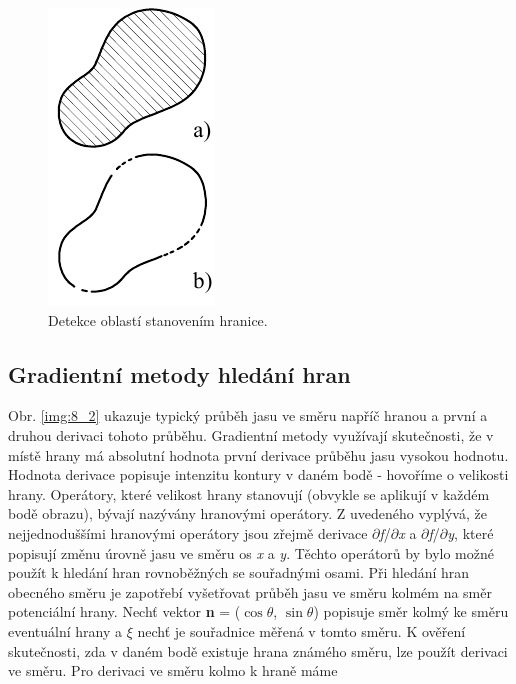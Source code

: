 \begin{figure}[th]
    \begin{center}
        \includegraphics[scale=1.0]{08_segmentace/images/img_8_1.pdf}
    \end{center}
    \caption{Detekce oblastí stanovením hranice.}
    \label{img:8_1}
\end{figure}

\subsection*{Gradientní metody hledání hran}

Obr. \ref{img:8_2} ukazuje typický průběh jasu ve směru napříč hranou a první a druhou derivaci tohoto průběhu. Gradientní metody využívají skutečnosti, že v místě hrany má absolutní hodnota první derivace průběhu jasu vysokou hodnotu. Hodnota derivace popisuje intenzitu kontury v daném bodě - hovoříme o velikosti hrany. Operátory, které velikost hrany stanovují (obvykle se aplikují v každém bodě obrazu), bývají nazývány hranovými operátory. Z uvedeného vyplývá, že nejjednoduššími hranovými operátory jsou zřejmě derivace $\partial$\textit{f}/$\partial$\textit{x} a $\partial$\textit{f}/$\partial$\textit{y}, které popisují změnu úrovně jasu ve směru os \textit{x} a \textit{y}. Těchto operátorů by bylo možné použít k hledání hran rovnoběžných se souřadnými osami. Při hledání hran obecného směru je zapotřebí vyšetřovat průběh jasu ve směru kolmém na směr potenciální hrany. Nechť vektor \textbf{n} = ($\cos \theta$, $\sin \theta$) popisuje směr kolmý ke směru eventuální hrany a $\xi$ nechť je souřadnice měřená v tomto směru. K ověření skutečnosti, zda v daném bodě existuje hrana známého směru, lze použít derivaci ve směru. Pro derivaci ve směru kolmo k hraně máme

